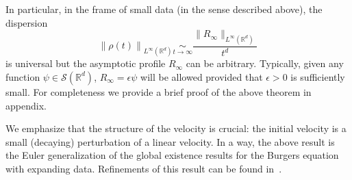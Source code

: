 \documentclass[11pt]{article}
\theoremstyle{definition}
\numberwithin{equation}{section}
\numberwithin{figure}{section}
\numberwithin{table}{section}
\newcommand*\R{\mathbb{R}}
\newcommand*\Sch{\mathcal{S}}
\newcommand*\<{\left\langle}
\renewcommand*\>{\right\rangle}
\newcommand*\Eq[2]{\mathop{\sim}\limits_{#1\rightarrow#2}}
\begin{document}
In particular, in the frame of small data (in the sense described above), the dispersion
\begin{equation*}
\left\| \rho(t)\right\|_{L^\infty(\R^d)}\Eq t \infty \frac{\|R_\infty\|_{L^\infty(\R^d)}}{t^d}
\end{equation*}
is universal but the asymptotic profile $R_\infty$ can be arbitrary. Typically, given any function $\psi\in \Sch(\R^d)$, $R_\infty= \epsilon \psi$ will be allowed provided that $\epsilon>0$ is sufficiently small. For completeness we provide a brief proof of the above theorem in appendix.

We emphasize that the structure of the velocity is crucial: the initial velocity is a small (decaying) perturbation of a linear velocity. In a way, the above result is the Euler generalization of the global existence results for the Burgers equation with expanding data. Refinements of this result can be found in~\cite{GrSe97,Gra98,Serre2017}.
\end{document}
